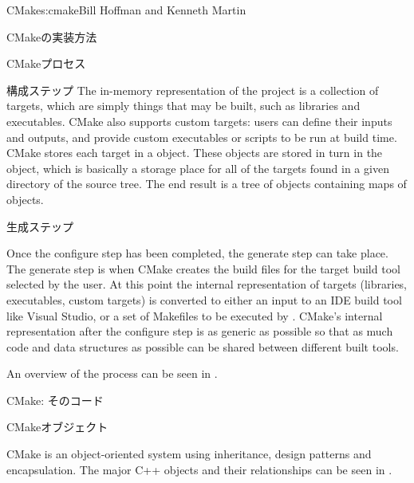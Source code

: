 \begin{aosachapter}{CMake}{s:cmake}{Bill Hoffman and Kenneth Martin}
\begin{aosasect1}{CMakeの実装方法}
\begin{aosasect2}{CMakeプロセス}
\begin{aosasect3}{構成ステップ}
The in-memory representation of the project is a collection of
targets, which are simply things that may be built, such as
libraries and executables. CMake also supports custom
targets: users can define their inputs and outputs, and provide
custom executables or scripts to be run at build time. CMake
stores each target in a  object. These objects are
stored in turn in the  object, which is basically a
storage place for all of the targets found in a given directory of the
source tree. The end result is a tree of  objects
containing maps of  objects.

\end{aosasect3}

\begin{aosasect3}{生成ステップ}

Once the configure step has been completed, the generate step can take
place. The generate step is when CMake creates the build files for the
target build tool selected by the user. At this point the internal
representation of targets (libraries, executables, custom targets) is
converted to either an input to an IDE build tool like Visual Studio,
or a set of Makefiles to be executed by . CMake's internal
representation after the configure step is as generic as possible so
that as much code and data structures as possible can be shared
between different built tools.

An overview of the process can be seen in .


\end{aosasect3}

\end{aosasect2}

\begin{aosasect2}{CMake: そのコード}

\begin{aosasect3}{CMakeオブジェクト}

CMake is an object-oriented system using inheritance, design patterns
and encapsulation.  The major C++ objects and their relationships can
be seen in .


\end{aosasect3}
\end{aosasect2}
\end{aosasect1}
\end{aosachapter}
